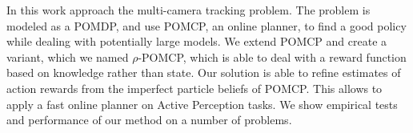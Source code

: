 In this work approach the multi-camera tracking problem. The problem is modeled as a POMDP, and use
POMCP, an online planner, to find a good policy while dealing with potentially large models. We
extend POMCP and create a variant, which we named $\rho$-POMCP, which is able to deal with a reward
function based on knowledge rather than state. Our solution is able to refine estimates of action
rewards from the imperfect particle beliefs of POMCP. This allows to apply a fast online planner on
Active Perception tasks. We show empirical tests and performance of our method on a number of
problems.
